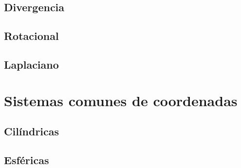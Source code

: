 \documentclass[12pt, fleqn]{report}                             %
\theoremstyle{break}                                            %
\begin{document}
            \subsection{Divergencia}
            
            \subsection{Rotacional}
            
            \subsection{Laplaciano}
            
        \section{Sistemas comunes de coordenadas}
        
            \subsection{Cilíndricas}
            
            \subsection{Esféricas}
            
\end{document}
